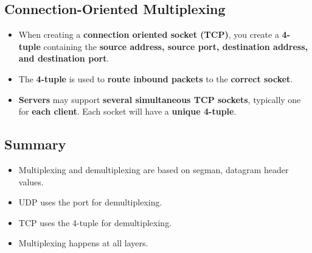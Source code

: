 \documentclass[16pt]{article}
\begin{document}
    \subsection*{Connection-Oriented Multiplexing}
    \begin{itemize}
        \item When creating a \textbf{connection oriented socket (TCP)}, you create a \textbf{4-tuple} containing the \textbf{source address, source port, destination address, and destination port}.
        \item The \textbf{4-tuple} is used to \textbf{route inbound packets} to the \textbf{correct socket}.
        \item \textbf{Servers} may support \textbf{several simultaneous TCP sockets}, typically one for \textbf{each client}. Each socket will have a \textbf{unique 4-tuple}.
    \end{itemize}

    \subsection*{Summary}
    \begin{itemize}
        \item Multiplexing and demultiplexing are based on segman, datagram header values.
        \item UDP uses the port for demultiplexing.
        \item TCP uses the 4-tuple for demultiplexing.
        \item Multiplexing happens at all layers.
    \end{itemize}
    
    \section*{}
\end{document}
